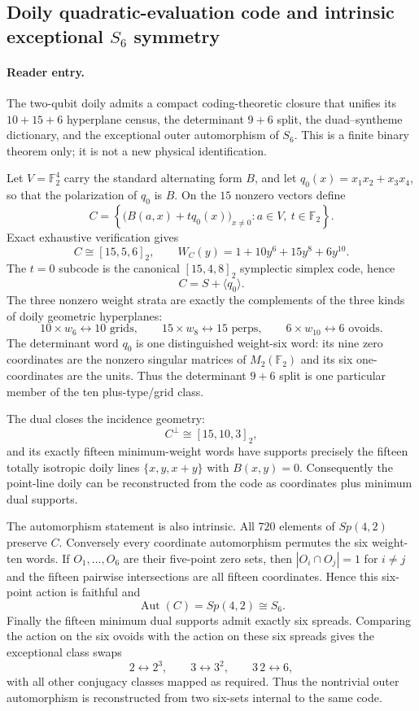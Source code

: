 \subsection{Doily quadratic-evaluation code and intrinsic exceptional $S_6$ symmetry}
\label{sec:doily-quadratic-evaluation-code}

\paragraph{Reader entry.}
The two-qubit doily admits a compact coding-theoretic closure that unifies its
$10+15+6$ hyperplane census, the determinant $9+6$ split, the duad--syntheme
dictionary, and the exceptional outer automorphism of $S_6$. This is a finite
binary theorem only; it is not a new physical identification.

Let $V=\mathbb F_2^4$ carry the standard alternating form $B$, and let
$q_0(x)=x_1x_2+x_3x_4$, so that the polarization of $q_0$ is $B$. On the
$15$ nonzero vectors define
\[
 C=\left\{\big(B(a,x)+tq_0(x)\big)_{x\ne0}:a\in V,\ t\in\mathbb F_2\right\}.
\]
Exact exhaustive verification gives
\[
 \boxed{C\cong[15,5,6]_2},\qquad
 W_C(y)=1+10y^6+15y^8+6y^{10}.
\]
The $t=0$ subcode is the canonical $[15,4,8]_2$ symplectic simplex code, hence
\[
 \boxed{C=S+\langle q_0\rangle}.
\]
The three nonzero weight strata are exactly the complements of the three kinds
of doily geometric hyperplanes:
\[
 10\times w_6\leftrightarrow10\text{ grids},\qquad
 15\times w_8\leftrightarrow15\text{ perps},\qquad
 6\times w_{10}\leftrightarrow6\text{ ovoids}.
\]
The determinant word $q_0$ is one distinguished weight-six word: its nine zero
coordinates are the nonzero singular matrices of $M_2(\mathbb F_2)$ and its six
one-coordinates are the units. Thus the determinant $9+6$ split is one
particular member of the ten plus-type/grid class.

The dual closes the incidence geometry:
\[
 \boxed{C^\perp\cong[15,10,3]_2},
\]
and its exactly fifteen minimum-weight words have supports precisely the fifteen
totally isotropic doily lines $\{x,y,x+y\}$ with $B(x,y)=0$. Consequently the
point-line doily can be reconstructed from the code as coordinates plus minimum
dual supports.

The automorphism statement is also intrinsic. All $720$ elements of
$Sp(4,2)$ preserve $C$. Conversely every coordinate automorphism permutes the
six weight-ten words. If $O_1,\ldots,O_6$ are their five-point zero sets, then
$|O_i\cap O_j|=1$ for $i\ne j$ and the fifteen pairwise intersections are all
fifteen coordinates. Hence this six-point action is faithful and
\[
 \boxed{\operatorname{Aut}(C)=Sp(4,2)\cong S_6}.
\]
Finally the fifteen minimum dual supports admit exactly six spreads. Comparing
the action on the six ovoids with the action on these six spreads gives the
exceptional class swaps
\[
 \boxed{2\leftrightarrow2^3,\qquad 3\leftrightarrow3^2,\qquad 3\,2\leftrightarrow6},
\]
with all other conjugacy classes mapped as required. Thus the nontrivial
outer automorphism is reconstructed from two six-sets internal to the same code.

